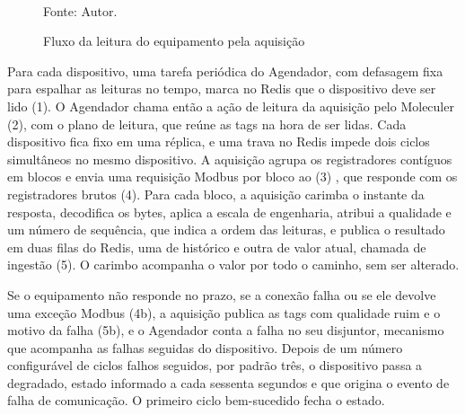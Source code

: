 \begin{figure}[H]
    \centering
    \caption{Fluxo da leitura do equipamento pela aquisição}
    \label{fig:fx_campo_aquisicao}
    \vspace{0.4cm}
    \vspace{0.2cm} \\
    Fonte: Autor.
\end{figure}

\par Para cada dispositivo, uma tarefa periódica do Agendador, com defasagem fixa para espalhar as leituras no tempo, marca no Redis que o dispositivo deve ser lido (1). O Agendador chama então a ação de leitura da aquisição pelo Moleculer (2), com o plano de leitura, que reúne as tags na hora de ser lidas. Cada dispositivo fica fixo em uma réplica, e uma trava no Redis impede dois ciclos simultâneos no mesmo dispositivo. A aquisição agrupa os registradores contíguos em blocos e envia uma requisição Modbus por bloco ao  (3) \cite{MODBUS_TCP_IMPLEMENTATION_GUIDE}, que responde com os registradores brutos (4). Para cada bloco, a aquisição carimba o instante da resposta, decodifica os bytes, aplica a escala de engenharia, atribui a qualidade e um número de sequência, que indica a ordem das leituras, e publica o resultado em duas filas do Redis, uma de histórico e outra de valor atual, chamada de ingestão (5). O carimbo acompanha o valor por todo o caminho, sem ser alterado.

\par Se o equipamento não responde no prazo, se a conexão falha ou se ele devolve uma exceção Modbus (4b), a aquisição publica as tags com qualidade ruim e o motivo da falha (5b), e o Agendador conta a falha no seu disjuntor, mecanismo que acompanha as falhas seguidas do dispositivo. Depois de um número configurável de ciclos falhos seguidos, por padrão três, o dispositivo passa a degradado, estado informado a cada sessenta segundos e que origina o evento de falha de comunicação. O primeiro ciclo bem-sucedido fecha o estado.

